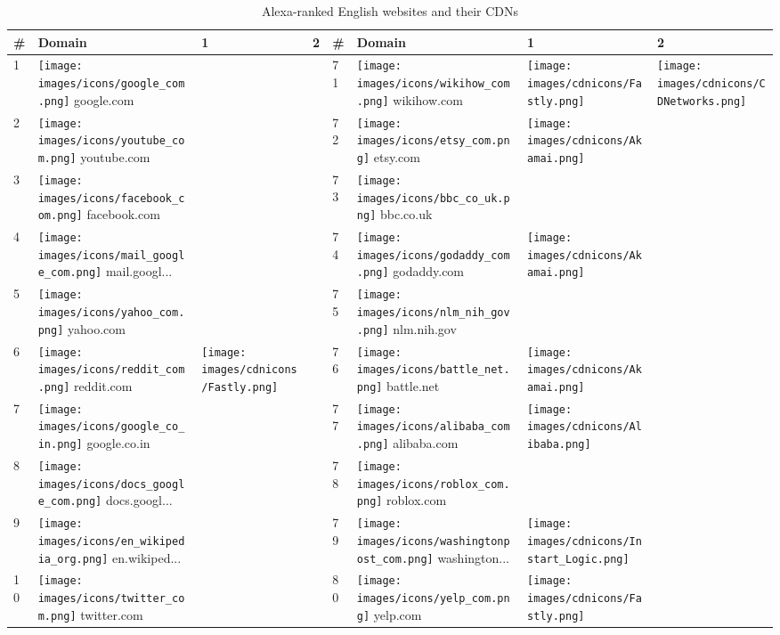 \begin{table}[tbp]
\centering
\caption{Alexa-ranked English websites and their CDNs}
\label{cdn-table}
\begin{tabular}{|llll|llll|}
\hline
\# & Domain & 1 & 2 & \# & Domain & 1 & 2 \\
\hline
1 & \texttt{[image: images/icons/google\_com.png]} google.com & & & 71 & \texttt{[image: images/icons/wikihow\_com.png]} wikihow.com & \texttt{[image: images/cdnicons/Fastly.png]} & \texttt{[image: images/cdnicons/CDNetworks.png]} \\
2 & \texttt{[image: images/icons/youtube\_com.png]} youtube.com & & & 72 & \texttt{[image: images/icons/etsy\_com.png]} etsy.com & \texttt{[image: images/cdnicons/Akamai.png]} & \\
3 & \texttt{[image: images/icons/facebook\_com.png]} facebook.com & & & 73 & \texttt{[image: images/icons/bbc\_co\_uk.png]} bbc.co.uk & & \\
4 & \texttt{[image: images/icons/mail\_google\_com.png]} mail.googl... & & & 74 & \texttt{[image: images/icons/godaddy\_com.png]} godaddy.com & \texttt{[image: images/cdnicons/Akamai.png]} & \\
5 & \texttt{[image: images/icons/yahoo\_com.png]} yahoo.com & & & 75 & \texttt{[image: images/icons/nlm\_nih\_gov.png]} nlm.nih.gov & & \\
6 & \texttt{[image: images/icons/reddit\_com.png]} reddit.com & \texttt{[image: images/cdnicons/Fastly.png]} & & 76 & \texttt{[image: images/icons/battle\_net.png]} battle.net & \texttt{[image: images/cdnicons/Akamai.png]} & \\
7 & \texttt{[image: images/icons/google\_co\_in.png]} google.co.in & & & 77 & \texttt{[image: images/icons/alibaba\_com.png]} alibaba.com & \texttt{[image: images/cdnicons/Alibaba.png]} & \\
8 & \texttt{[image: images/icons/docs\_google\_com.png]} docs.googl... & & & 78 & \texttt{[image: images/icons/roblox\_com.png]} roblox.com & & \\
9 & \texttt{[image: images/icons/en\_wikipedia\_org.png]} en.wikiped... & & & 79 & \texttt{[image: images/icons/washingtonpost\_com.png]} washington... & \texttt{[image: images/cdnicons/Instart\_Logic.png]} & \\
10 & \texttt{[image: images/icons/twitter\_com.png]} twitter.com & & & 80 & \texttt{[image: images/icons/yelp\_com.png]} yelp.com & \texttt{[image: images/cdnicons/Fastly.png]} & \\

\end{tabular}
\end{table}
